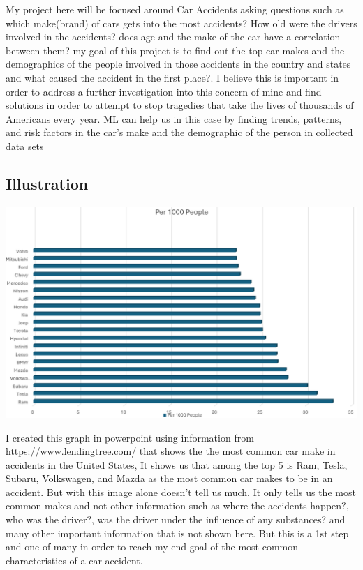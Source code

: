 \documentclass[
  letterpaper,
  DIV=11,
  numbers=noendperiod]{scrartcl}
\begin{document}
My project here will be focused around Car Accidents asking questions
such as which make(brand) of cars gets into the most accidents? How old
were the drivers involved in the accidents? does age and the make of the
car have a correlation between them? my goal of this project is to find
out the top car makes and the demographics of the people involved in
those accidents in the country and states and what caused the accident
in the first place?. I believe this is important in order to address a
further investigation into this concern of mine and find solutions in
order to attempt to stop tragedies that take the lives of thousands of
Americans every year. ML can help us in this case by finding trends,
patterns, and risk factors in the car's make and the demographic of the
person in collected data sets

\hypertarget{illustration}{%
\subsection{Illustration}\label{illustration}}

\includegraphics{Screenshot 2024-04-14 124410.png}

I created this graph in powerpoint using information from
https://www.lendingtree.com/ that shows the the most common car make in
accidents in the United States, It shows us that among the top 5 is Ram,
Tesla, Subaru, Volkswagen, and Mazda as the most common car makes to be
in an accident. But with this image alone doesn't tell us much. It only
tells us the most common makes and not other information such as where
the accidents happen?, who was the driver?, was the driver under the
influence of any substances? and many other important information that
is not shown here. But this is a 1st step and one of many in order to
reach my end goal of the most common characteristics of a car accident.
\end{document}
